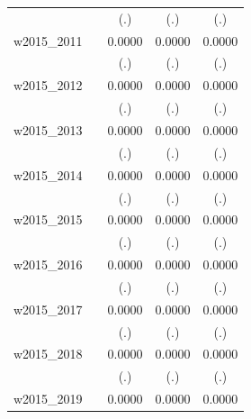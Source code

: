 \begin{table}[htbp]
\begin{tabular}{l*{4}{c}}
            &                     &         (.)         &         (.)         &         (.)         \\
[1em]
w2015\_2011  &                     &      0.0000         &      0.0000         &      0.0000         \\
            &                     &         (.)         &         (.)         &         (.)         \\
[1em]
w2015\_2012  &                     &      0.0000         &      0.0000         &      0.0000         \\
            &                     &         (.)         &         (.)         &         (.)         \\
[1em]
w2015\_2013  &                     &      0.0000         &      0.0000         &      0.0000         \\
            &                     &         (.)         &         (.)         &         (.)         \\
[1em]
w2015\_2014  &                     &      0.0000         &      0.0000         &      0.0000         \\
            &                     &         (.)         &         (.)         &         (.)         \\
[1em]
w2015\_2015  &                     &      0.0000         &      0.0000         &      0.0000         \\
            &                     &         (.)         &         (.)         &         (.)         \\
[1em]
w2015\_2016  &                     &      0.0000         &      0.0000         &      0.0000         \\
            &                     &         (.)         &         (.)         &         (.)         \\
[1em]
w2015\_2017  &                     &      0.0000         &      0.0000         &      0.0000         \\
            &                     &         (.)         &         (.)         &         (.)         \\
[1em]
w2015\_2018  &                     &      0.0000         &      0.0000         &      0.0000         \\
            &                     &         (.)         &         (.)         &         (.)         \\
[1em]
w2015\_2019  &                     &      0.0000         &      0.0000         &      0.0000         \\

\end{tabular}
\end{table}
